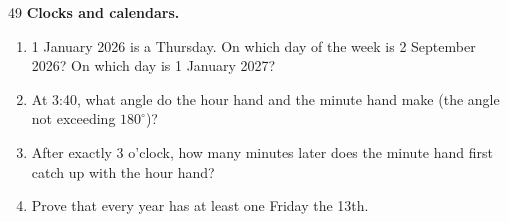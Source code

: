 \begin{probbox}{49}{}
\textbf{Clocks and calendars.}
\begin{enumerate}[label=\alph*),leftmargin=1.6em,itemsep=1pt,topsep=2pt]
  \item 1 January 2026 is a Thursday. On which day of the week is 2 September 2026? On which day is
  1 January 2027?
  \item At 3:40, what angle do the hour hand and the minute hand make (the angle not exceeding $180^\circ$)?
  \item After exactly 3 o'clock, how many minutes later does the minute hand first catch up with the hour hand?
  \item {} Prove that every year has at least one Friday the 13th.
\end{enumerate}
\end{probbox}
